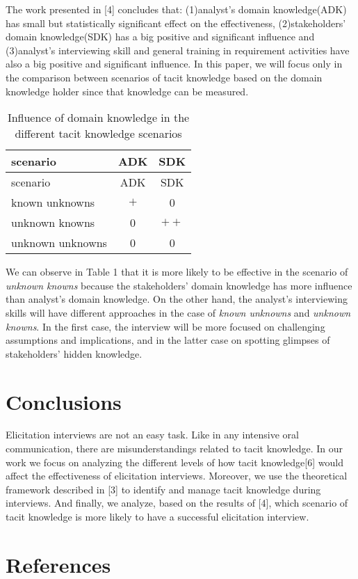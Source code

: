 \documentclass[]{llncs}
\begin{document}
The work presented in {[}4{]} concludes that: (1)analyst's domain
knowledge(ADK) has small but statistically significant effect on the
effectiveness, (2)stakeholders' domain knowledge(SDK) has a big positive
and significant influence and (3)analyst's interviewing skill and
general training in requirement activities have also a big positive and
significant influence. In this paper, we will focus only in the
comparison between scenarios of tacit knowledge based on the domain
knowledge holder since that knowledge can be measured.

\begin{longtable}[]{@{}lcc@{}}
\caption{Influence of domain knowledge in the different tacit knowledge
scenarios}\tabularnewline
\toprule
scenario & ADK & SDK\tabularnewline
\midrule
\endfirsthead
\toprule
scenario & ADK & SDK\tabularnewline
\midrule
\endhead
known unknowns & \(+\) & 0\tabularnewline
unknown knowns & 0 & \(++\)\tabularnewline
unknown unknowns & 0 & 0\tabularnewline
\bottomrule
\end{longtable}

We can observe in Table 1 that it is more likely to be effective in the
scenario of \emph{unknown knowns} because the stakeholders' domain
knowledge has more influence than analyst's domain knowledge. On the
other hand, the analyst's interviewing skills will have different
approaches in the case of \emph{known unknowns} and \emph{unknown
knowns}. In the first case, the interview will be more focused on
challenging assumptions and implications, and in the latter case on
spotting glimpses of stakeholders' hidden knowledge.

\hypertarget{conclusions}{%
\section{Conclusions}\label{conclusions}}

Elicitation interviews are not an easy task. Like in any intensive oral
communication, there are misunderstandings related to tacit knowledge.
In our work we focus on analyzing the different levels of how tacit
knowledge{[}6{]} would affect the effectiveness of elicitation
interviews. Moreover, we use the theoretical framework described in
{[}3{]} to identify and manage tacit knowledge during interviews. And
finally, we analyze, based on the results of {[}4{]}, which scenario of
tacit knowledge is more likely to have a successful elicitation
interview.

\hypertarget{references}{%
\section*{References}\label{references}}
\end{document}

